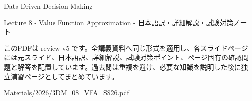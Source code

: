 \documentclass[a4paper,landscape,9pt]{article}
\begin{document}
\begin{titlepage}
\centering
\vspace*{2cm}
{\Huge Data Driven Decision Making\par}
\vspace{0.5cm}
{\Large Lecture 8 - Value Function Approximation - 日本語訳・詳細解説・試験対策ノート\par}
\vspace{1cm}
\begin{minipage}{0.82\textwidth}
このPDFは review v5 です。全講義資料へ同じ形式を適用し、各スライドページには元スライド、日本語訳、詳細解説、試験対策ポイント、ページ固有の確認問題と解答を配置しています。過去問は重複を避け、必要な知識を説明した後に独立演習ページとしてまとめています。
\end{minipage}
\vfill
{\large Materials/2026/3DM\_08\_VFA\_SS26.pdf}
\end{titlepage}
\tableofcontents
\clearpage

\end{document}
